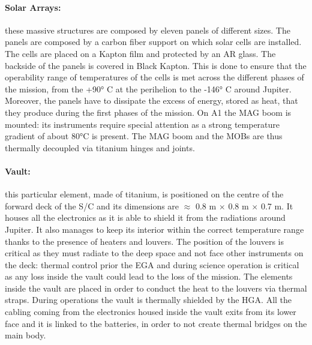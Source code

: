 \vspace{-4mm}

\paragraph{Solar Arrays:} these massive structures are composed by eleven panels of different sizes.
The panels are composed by a carbon fiber support on which solar cells are installed. The cells are placed on a Kapton film and protected by an AR glass. The backside of the panels is covered in Black Kapton.
This is done to ensure that the operability range of temperatures of the cells is met across the different phases of the mission, from the +90° C at the perihelion to the -146° C around Jupiter. \cite{pannelli}
Moreover, the panels have to dissipate the excess of energy, stored as heat, that they produce during the first phases of the mission.
On A1 the MAG boom is mounted: its instruments require special attention as a strong temperature gradient of about 80°C is present. \cite{pannelli}
The MAG boom and the MOBs are thus thermally decoupled via titanium hinges and joints. \cite{pannelli}

\vspace{-4mm}

\paragraph{Vault:}this particular element, made of titanium, is positioned on the centre of the forward deck of the S/C and its dimensions are  $\approx$ 0.8 m $\times$ 0.8 m $\times$ 0.7 m. \cite{Rad_vault}
It houses all the electronics as it is able to shield it from the radiations around Jupiter.
It also manages to keep its interior within the correct temperature range thanks to the presence of heaters and louvers.
The position of the louvers is critical as they must radiate to the deep space and not face other instruments on the deck: thermal control prior the EGA and during science operation is critical as any loss inside the vault could lead to the loss of the mission.
The elements inside the vault are placed in order to conduct the heat to the louvers via thermal straps. \cite{louvers}
During operations the vault is thermally shielded by the HGA. All the cabling coming from the electronics housed inside the vault exits from its lower face and it is linked to the batteries, in order to not create thermal bridges on the main body.

\vspace{-4mm}

